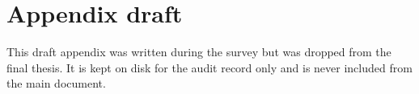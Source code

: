 \chapter{Appendix draft}\label{ch:appendix}
This draft appendix was written during the survey but was dropped
from the final thesis. It is kept on disk for the audit record only
and is never included from the main document.
